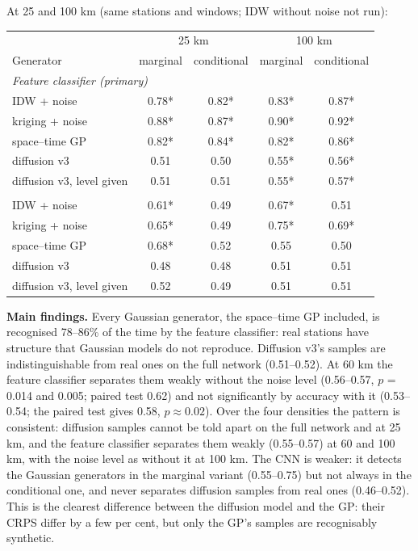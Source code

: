 \documentclass[11pt,a4paper]{article}
\begin{document}
At 25 and 100 km (same stations and windows; IDW without noise not run):

\begin{center}\small
\begin{tabular}{lcccc}
\toprule
& \multicolumn{2}{c}{25 km} & \multicolumn{2}{c}{100 km} \\
Generator & marginal & conditional & marginal & conditional \\
\midrule
\multicolumn{5}{l}{\emph{Feature classifier (primary)}} \\
IDW + noise & 0.78* & 0.82* & 0.83* & 0.87* \\
kriging + noise & 0.88* & 0.87* & 0.90* & 0.92* \\
space--time GP & 0.82* & 0.84* & 0.82* & 0.86* \\
diffusion v3 & 0.51 & 0.50 & 0.55* & 0.56* \\
diffusion v3, level given & 0.51 & 0.51 & 0.55* & 0.57* \\
\addlinespace
\multicolumn{5}{l}{\emph{CNN (second check)}} \\
IDW + noise & 0.61* & 0.49 & 0.67* & 0.51 \\
kriging + noise & 0.65* & 0.49 & 0.75* & 0.69* \\
space--time GP & 0.68* & 0.52 & 0.55 & 0.50 \\
diffusion v3 & 0.48 & 0.48 & 0.51 & 0.51 \\
diffusion v3, level given & 0.52 & 0.49 & 0.51 & 0.51 \\
\bottomrule
\end{tabular}
\end{center}

\textbf{Main findings.} Every Gaussian generator, the space--time GP included, is recognised 78--86\% of the time by the feature classifier: real stations have structure that Gaussian models do not reproduce. Diffusion v3's samples are indistinguishable from real ones on the full network (0.51--0.52). At 60 km the feature classifier separates them weakly without the noise level (0.56--0.57, $p$ = 0.014 and 0.005; paired test 0.62) and not significantly by accuracy with it (0.53--0.54; the paired test gives 0.58, $p \approx 0.02$). Over the four densities the pattern is consistent: diffusion samples cannot be told apart on the full network and at 25 km, and the feature classifier separates them weakly (0.55--0.57) at 60 and 100 km, with the noise level as without it at 100 km. The CNN is weaker: it detects the Gaussian generators in the marginal variant (0.55--0.75) but not always in the conditional one, and never separates diffusion samples from real ones (0.46--0.52). This is the clearest difference between the diffusion model and the GP: their CRPS differ by a few per cent, but only the GP's samples are recognisably synthetic.
\end{document}
